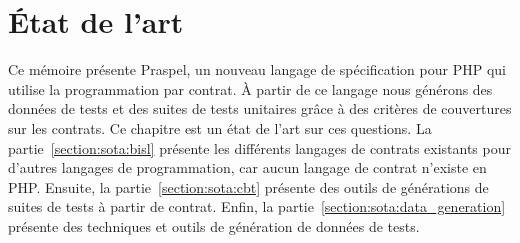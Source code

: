 \chapter{État de l'art}
\label{chapter:state}

\minitoc

Ce mémoire présente Praspel, un nouveau langage de spécification pour PHP qui
utilise la programmation par contrat. À partir de ce langage nous générons des
données de tests et des suites de tests unitaires grâce à des critères de
couvertures sur les contrats. Ce chapitre est un état de l'art sur ces
questions. La partie~\ref{section:sota:bisl} présente les différents langages de
contrats existants pour d'autres langages de programmation, car aucun langage de
contrat n'existe en PHP. Ensuite, la partie~\ref{section:sota:cbt} présente des
outils de générations de suites de tests à partir de contrat. Enfin, la
partie~\ref{section:sota:data_generation} présente des techniques et outils de
génération de données de tests.

